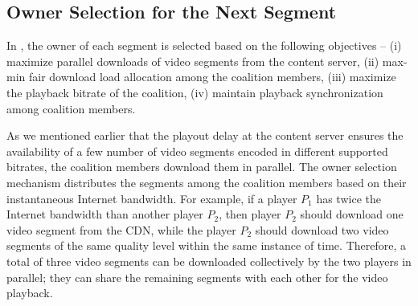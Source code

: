 %
%
%
\subsection{Owner Selection for the Next Segment\label{sec:nextLeadSelect}} In {\our}, the owner of each segment is selected based on the following objectives -- (i) maximize parallel downloads of video segments from the content server, (ii) max-min fair download load allocation among the coalition members, (iii) maximize the playback bitrate of the coalition, (iv) maintain playback synchronization among coalition members. 

As we mentioned earlier that the playout delay at the content server ensures the availability of a few number of video segments encoded in different supported bitrates, the coalition members download them in parallel. The owner selection mechanism distributes the segments among the coalition members based on their instantaneous Internet bandwidth. For example, if a player $P_1$ has twice the Internet bandwidth than another player $P_2$, then player $P_2$ should download one video segment from the CDN, while the player $P_2$ should download two video segments of the same quality level within the same instance of time. Therefore, a total of three video segments can be downloaded collectively by the two players in parallel; they can share the remaining segments with each other for the video playback.    

